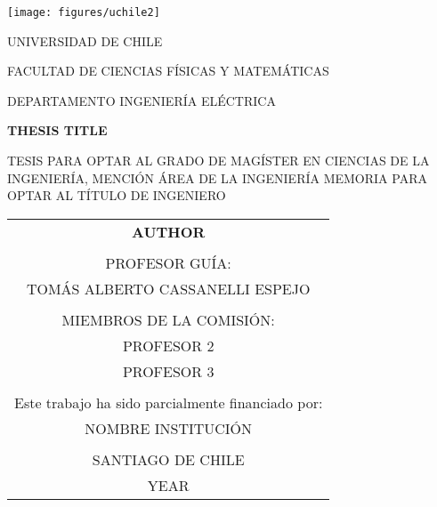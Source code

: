 \documentclass[
	12pt,
	letterpaper,
  oneside
  ]{book}
\begin{document}
  \thispagestyle{empty}
	\def\arraystretch{1.15}

  
  \begin{minipage}[t]{0.125\linewidth}
    \texttt{[image: figures/uchile2]}
  \end{minipage}
	\begin{minipage}[b]{0.8\linewidth}
		\MakeUppercase{Universidad de Chile}

		\MakeUppercase{Facultad de Ciencias Físicas y Matemáticas}

		\MakeUppercase{Departamento Ingeniería Eléctrica}
	\end{minipage}

	\begin{center}
    \vspace{1.5cm}

    \MakeUppercase{\textbf{Thesis Title}}

    \vspace{1.5cm}

    \MakeUppercase{Tesis para optar al grado de magíster en ciencias de la ingeniería, mención área de la ingeniería}
	  \bigbreak\vspace{0.3cm}
    \MakeUppercase{Memoria para optar al título de ingeniero}
	
    \vfill

    \begin{tabular}{c}
      \MakeUppercase{\textbf{Author}} \\
      \vspace{1.0cm} \\
      PROFESOR GUÍA: \\
      TOMÁS ALBERTO CASSANELLI ESPEJO \\
      \vspace{0.5cm} \\
      MIEMBROS DE LA COMISIÓN: \\
      PROFESOR 2 \\
      PROFESOR 3 \\
      \vspace{0.5cm} \\
      Este trabajo ha sido parcialmente financiado por: \\
      NOMBRE INSTITUCIÓN \\
      \vspace{0.5cm} \\
      \MakeUppercase{Santiago de Chile} \\
      \MakeUppercase{year}
    \end{tabular}

	\end{center}
\end{document}
